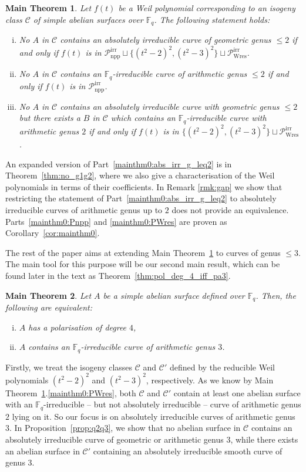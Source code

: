 \documentclass[11pt]{amsart}
\newcommand\Fq{\mathbb{F}_q}
\newcommand\cC{\mathcal{C}}
\theoremstyle{plain}
\newtheorem{maintheorem}{Main Theorem}
\theoremstyle{definition}
\newcommand\PirrA{\mathcal{P}^\mathrm{irr}_\mathrm{npp}}
\newcommand\PirrB{\mathcal{P}^\mathrm{irr}_\mathrm{Wres}}
\begin{document}
\begin{maintheorem}\label{mainthm0}
    Let $f(t)$ be a Weil polynomial corresponding to an isogeny class $\cC$ of simple abelian surfaces over $\Fq$.
    The following statement holds:
    \begin{enumerate}[(i)]
        \item \label{mainthm0:abs_irr_g_leq2} No $A$ in $\cC$ contains an absolutely irreducible curve of geometric genus $\leq 2$ if and only if $f(t)$ is in $\PirrA \sqcup \{ (t^2-2)^2 , (t^2-3)^2 \} \sqcup\PirrB$.
        \item \label{mainthm0:Pnpp} No $A$ in $\cC$ contains an $\Fq$-irreducible curve of arithmetic genus $\leq 2$ if and only if  $f(t)$ is in $\PirrA$.
        \item \label{mainthm0:PWres} No $A$ in $\cC$ contains an absolutely irreducible curve with geometric genus $\leq 2$ 
        but there exists a $B$ in $\cC$ which contains an $\Fq$-irreducible curve with arithmetic genus $2$  if and only if $f(t)$ is in $\{ (t^2-2)^2 , (t^2-3)^2 \} \sqcup\PirrB$.
    \end{enumerate}
\end{maintheorem}
An expanded version of Part~\ref{mainthm0:abs_irr_g_leq2} is in Theorem~\ref{thm:no_g1g2}, where we also give a characterisation of the Weil polynomials in terms of their coefficients.
In Remark \ref{rmk:gap} we show that restricting the statement of Part~\ref{mainthm0:abs_irr_g_leq2}  to absolutely irreducible curves of arithmetic genus up to $2$ does not provide an equivalence. Parts~\ref{mainthm0:Pnpp} and \ref{mainthm0:PWres} are proven as Corollary~\ref{cor:mainthm0}.

The rest of the paper aims at extending Main Theorem~\ref{mainthm0} to curves of genus $\leq 3$.
The main tool for this purpose will be our second main result, which can be found later in the text as Theorem~\ref{thm:pol_deg_4_iff_pa3}.
\begin{maintheorem}\label{mainthm1}
    Let $A$ be a simple abelian surface defined over $\Fq$. Then, the following are equivalent:
    \begin{enumerate}[(i)]
        \item $A$ has a polarisation of degree $4$,
        \item $A$ contains an $\Fq$-irreducible curve of arithmetic genus $3$.
    \end{enumerate}
\end{maintheorem}

Firstly, we treat the isogeny classes $\cC$ and $\cC'$ defined by the reducible Weil polynomials $(t^2-2)^2$ and $(t^2-3)^2$, respectively.
As we know by Main Theorem~\ref{mainthm0}.\ref{mainthm0:PWres}, both $\cC$ and $\cC'$ contain at least one abelian surface with an $\Fq$-irreducible -- but not absolutely irreducible -- curve of arithmetic genus $2$ lying on it.
So our focus is on absolutely irreducible curves of arithmetic genus $3$.
In Proposition~\ref{prop:q2q3}, we show that no abelian surface in $\cC$ contains an absolutely irreducible curve of geometric or arithmetic genus $3$, while there exists an abelian surface in $\cC'$ containing an absolutely irreducible smooth curve of genus $3$.
\end{document}
